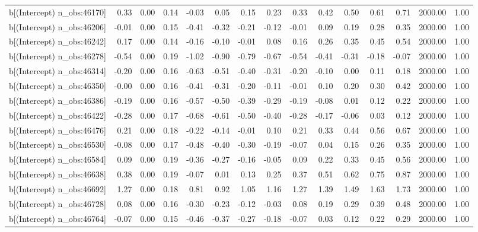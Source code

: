 \begin{table}[ht]
\begin{tabular}{rrrrrrrrrrrrrrr}
  b[(Intercept) n\_obs:46170] & 0.33 & 0.00 & 0.14 & -0.03 & 0.05 & 0.15 & 0.23 & 0.33 & 0.42 & 0.50 & 0.61 & 0.71 & 2000.00 & 1.00 \\ 
  b[(Intercept) n\_obs:46206] & -0.01 & 0.00 & 0.15 & -0.41 & -0.32 & -0.21 & -0.12 & -0.01 & 0.09 & 0.19 & 0.28 & 0.35 & 2000.00 & 1.00 \\ 
  b[(Intercept) n\_obs:46242] & 0.17 & 0.00 & 0.14 & -0.16 & -0.10 & -0.01 & 0.08 & 0.16 & 0.26 & 0.35 & 0.45 & 0.54 & 2000.00 & 1.00 \\ 
  b[(Intercept) n\_obs:46278] & -0.54 & 0.00 & 0.19 & -1.02 & -0.90 & -0.79 & -0.67 & -0.54 & -0.41 & -0.31 & -0.18 & -0.07 & 2000.00 & 1.00 \\ 
  b[(Intercept) n\_obs:46314] & -0.20 & 0.00 & 0.16 & -0.63 & -0.51 & -0.40 & -0.31 & -0.20 & -0.10 & 0.00 & 0.11 & 0.18 & 2000.00 & 1.00 \\ 
  b[(Intercept) n\_obs:46350] & -0.00 & 0.00 & 0.16 & -0.41 & -0.31 & -0.20 & -0.11 & -0.01 & 0.10 & 0.20 & 0.30 & 0.42 & 2000.00 & 1.00 \\ 
  b[(Intercept) n\_obs:46386] & -0.19 & 0.00 & 0.16 & -0.57 & -0.50 & -0.39 & -0.29 & -0.19 & -0.08 & 0.01 & 0.12 & 0.22 & 2000.00 & 1.00 \\ 
  b[(Intercept) n\_obs:46422] & -0.28 & 0.00 & 0.17 & -0.68 & -0.61 & -0.50 & -0.40 & -0.28 & -0.17 & -0.06 & 0.03 & 0.12 & 2000.00 & 1.00 \\ 
  b[(Intercept) n\_obs:46476] & 0.21 & 0.00 & 0.18 & -0.22 & -0.14 & -0.01 & 0.10 & 0.21 & 0.33 & 0.44 & 0.56 & 0.67 & 2000.00 & 1.00 \\ 
  b[(Intercept) n\_obs:46530] & -0.08 & 0.00 & 0.17 & -0.48 & -0.40 & -0.30 & -0.19 & -0.07 & 0.04 & 0.15 & 0.26 & 0.35 & 2000.00 & 1.00 \\ 
  b[(Intercept) n\_obs:46584] & 0.09 & 0.00 & 0.19 & -0.36 & -0.27 & -0.16 & -0.05 & 0.09 & 0.22 & 0.33 & 0.45 & 0.56 & 2000.00 & 1.00 \\ 
  b[(Intercept) n\_obs:46638] & 0.38 & 0.00 & 0.19 & -0.07 & 0.01 & 0.13 & 0.25 & 0.37 & 0.51 & 0.62 & 0.75 & 0.87 & 2000.00 & 1.00 \\ 
  b[(Intercept) n\_obs:46692] & 1.27 & 0.00 & 0.18 & 0.81 & 0.92 & 1.05 & 1.16 & 1.27 & 1.39 & 1.49 & 1.63 & 1.73 & 2000.00 & 1.00 \\ 
  b[(Intercept) n\_obs:46728] & 0.08 & 0.00 & 0.16 & -0.30 & -0.23 & -0.12 & -0.03 & 0.08 & 0.19 & 0.29 & 0.39 & 0.48 & 2000.00 & 1.00 \\ 
  b[(Intercept) n\_obs:46764] & -0.07 & 0.00 & 0.15 & -0.46 & -0.37 & -0.27 & -0.18 & -0.07 & 0.03 & 0.12 & 0.22 & 0.29 & 2000.00 & 1.00 \\ 

\end{tabular}
\end{table}
